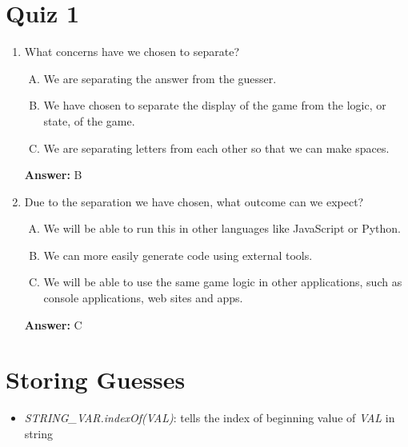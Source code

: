 \documentclass[12pt]{article}
\begin{document}
\section{Quiz 1}

\bigskip

\begin{enumerate}[1.]
    \item

    What concerns have we chosen to separate?

    \bigskip

    \begin{enumerate}[A.]
        \item We are separating the answer from the guesser.
        \item We have chosen to separate the display of the game from the logic, or state, of the game.
        \item We are separating letters from each other so that we can make spaces.
    \end{enumerate}

    \bigskip

    \textbf{Answer:} B

    \item

    Due to the separation we have chosen, what outcome can we expect?

    \bigskip

    \begin{enumerate}[A.]
        \item We will be able to run this in other languages like JavaScript or Python.
        \item We can more easily generate code using external tools.
        \item We will be able to use the same game logic in other applications, such as console applications, web sites and apps.
    \end{enumerate}

    \bigskip

    \textbf{Answer:} C

\end{enumerate}

\bigskip

\section{Storing Guesses}

\bigskip

\begin{itemize}
    \item \textit{STRING\_VAR.indexOf(VAL)}: tells the index of beginning value
    of \textit{VAL} in string
\end{itemize}
\end{document}
